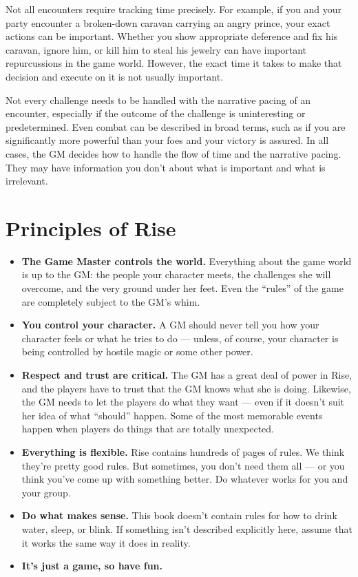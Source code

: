     Not all encounters require tracking time precisely.
    For example, if you and your party encounter a broken-down caravan carrying an angry prince, your exact actions can be important.
    Whether you show appropriate deference and fix his caravan, ignore him, or kill him to steal his jewelry can have important repurcussions in the game world.
    However, the exact time it takes to make that decision and execute on it is not usually important.

    Not every challenge needs to be handled with the narrative pacing of an encounter, especially if the outcome of the challenge is uninteresting or predetermined.
    Even combat can be described in broad terms, such as if you are significantly more powerful than your foes and your victory is assured.
    In all cases, the GM decides how to handle the flow of time and the narrative pacing.
    They may have information you don't about what is important and what is irrelevant.

\section{Principles of Rise}

    \begin{itemize}
        \item \textbf{The Game Master controls the world.} Everything about the game world is up to the GM\@: the people your character meets, the challenges she will overcome, and the very ground under her feet.
            Even the ``rules'' of the game are completely subject to the GM's whim.
        \item \textbf{You control your character.} A GM should never tell you how your character feels or what he tries to do --- unless, of course, your character is being controlled by hostile magic or some other power.
        \item \textbf{Respect and trust are critical.} The GM has a great deal of power in Rise, and the players have to trust that the GM knows what she is doing.
            Likewise, the GM needs to let the players do what they want --- even if it doesn't suit her idea of what ``should'' happen.
            Some of the most memorable events happen when players do things that are totally unexpected.
        \item \textbf{Everything is flexible.} Rise contains hundreds of pages of rules.
            We think they're pretty good rules.
            But sometimes, you don't need them all --- or you think you've come up with something better.
            Do whatever works for you and your group.
        \item \textbf{Do what makes sense.} This book doesn't contain rules for how to drink water, sleep, or blink.
            If something isn't described explicitly here, assume that it works the same way it does in reality.
        \item \textbf{It's just a game, so have fun.}
    \end{itemize}

